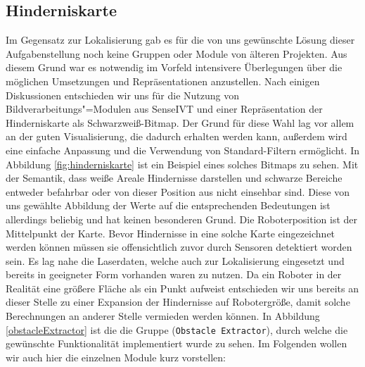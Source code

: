 \subsection{Hinderniskarte}
 Im Gegensatz zur Lokalisierung gab es für die von uns gewünschte Lösung dieser
 Aufgabenstellung noch keine Gruppen oder Module von älteren Projekten. Aus
 diesem Grund war es notwendig im Vorfeld intensivere Überlegungen über die möglichen
 Umsetzungen und Repräsentationen anzustellen.
 Nach einigen Diskussionen entschieden wir uns für die Nutzung von
 Bildverarbeitungs"=Modulen aus SenseIVT  und einer
 Repräsentation der Hinderniskarte als Schwarzweiß-Bitmap. Der Grund für diese Wahl lag vor allem an der guten
 Visualisierung, die dadurch erhalten werden kann, außerdem wird eine einfache Anpassung und die Verwendung
 von Standard-Filtern ermöglicht. 
 In Abbildung \ref{fig:hinderniskarte} ist ein Beispiel eines solches Bitmaps
 zu sehen. Mit der Semantik, dass weiße Areale Hindernisse darstellen und schwarze Bereiche entweder befahrbar
 oder von dieser Position aus nicht einsehbar sind. Diese von uns gewählte Abbildung der Werte
 auf die entsprechenden Bedeutungen ist allerdings beliebig und hat keinen besonderen Grund.
 Die Roboterposition ist der Mittelpunkt der Karte. Bevor Hindernisse in eine solche Karte eingezeichnet werden
 können müssen sie offensichtlich zuvor durch Sensoren detektiert worden sein. Es lag nahe die Laserdaten,
 welche auch zur Lokalisierung eingesetzt und bereits in geeigneter Form vorhanden waren zu nutzen.
 Da ein Roboter in der Realität eine größere Fläche als ein Punkt aufweist entschieden wir uns bereits an dieser
 Stelle zu einer Expansion der Hindernisse auf Robotergröße, damit solche Berechnungen an anderer Stelle vermieden
 werden können.
 In Abbildung \ref{obstacleExtractor} ist die die Gruppe (\lstinline{Obstacle Extractor}),
 durch welche die gewünschte Funktionalität implementiert wurde zu sehen.
 Im Folgenden wollen wir auch hier die einzelnen Module kurz vorstellen:

